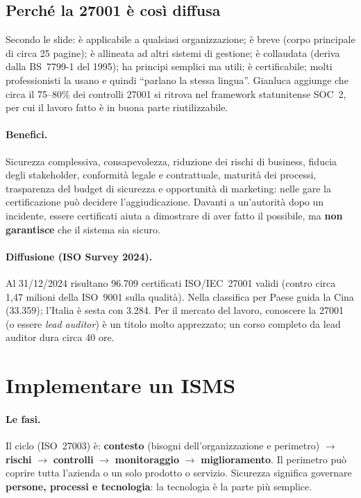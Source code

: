 \subsection{Perché la 27001 è così diffusa}
Secondo le slide: è applicabile a qualsiasi organizzazione; è breve (corpo principale di circa 25
pagine); è allineata ad altri sistemi di gestione; è collaudata (deriva dalla BS~7799-1 del 1995); ha
principi semplici ma utili; è certificabile; molti professionisti la usano e quindi ``parlano la stessa
lingua''. Gianluca aggiunge che circa il 75--80\% dei controlli 27001 si ritrova nel framework
statunitense SOC~2, per cui il lavoro fatto è in buona parte riutilizzabile.

\paragraph{Benefici.} Sicurezza complessiva, consapevolezza, riduzione dei rischi di business, fiducia
degli stakeholder, conformità legale e contrattuale, maturità dei processi, trasparenza del budget di
sicurezza e opportunità di marketing: nelle gare la certificazione può decidere l'aggiudicazione. Davanti
a un'autorità dopo un incidente, essere certificati aiuta a dimostrare di aver fatto il possibile, ma
\textbf{non garantisce} che il sistema sia sicuro.

\paragraph{Diffusione (ISO Survey 2024).} Al 31/12/2024 risultano 96.709 certificati ISO/IEC~27001 validi
(contro circa 1,47 milioni della ISO~9001 sulla qualità). Nella classifica per Paese guida la Cina
(33.359); l'Italia è sesta con 3.284. Per il mercato del lavoro, conoscere la 27001 (o essere
\emph{lead auditor}) è un titolo molto apprezzato; un corso completo da lead auditor dura circa 40 ore.

\section{Implementare un ISMS}

\paragraph{Le fasi.} Il ciclo (ISO~27003) è: \textbf{contesto} (bisogni dell'organizzazione e perimetro)
$\rightarrow$ \textbf{rischi} $\rightarrow$ \textbf{controlli} $\rightarrow$ \textbf{monitoraggio}
$\rightarrow$ \textbf{miglioramento}. Il perimetro può coprire tutta l'azienda o un solo prodotto o
servizio. Sicurezza significa governare \textbf{persone, processi e tecnologia}: la tecnologia è la parte
più semplice.

